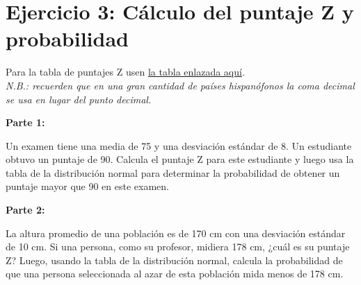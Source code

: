 \documentclass[11pt]{article}
\begin{document}
\section*{Ejercicio 3: Cálculo del puntaje Z y probabilidad}

Para la tabla de puntajes Z usen \href{https://estadistica-dma.ulpgc.es/estadFCM/pdf/distribuciones.pdf}{la tabla enlazada aquí}.\\ \textit{N.B.: recuerden que en una gran cantidad de países hispanófonos la coma decimal se usa en lugar del punto decimal.}

\textbf{Parte 1:}

Un examen tiene una media de 75 y una desviación estándar de 8. Un estudiante obtuvo un puntaje de 90. Calcula el puntaje Z para este estudiante y luego usa la tabla de la distribución normal para determinar la probabilidad de obtener un puntaje mayor que 90 en este examen.

\vspace{4cm} %

\textbf{Parte 2:}

La altura promedio de una población es de 170 cm con una desviación estándar de 10 cm. Si una persona, como su profesor, midiera 178 cm, ¿cuál es su puntaje Z? Luego, usando la tabla de la distribución normal, calcula la probabilidad de que una persona seleccionada al azar de esta población mida menos de 178 cm. 

\vspace{4cm} %
\end{document}
